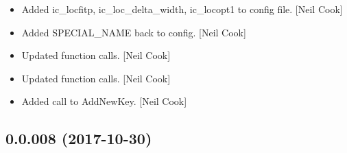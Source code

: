 \documentclass[a4paper,10pt,english]{report}
\begin{document}
\begin{itemize}
\item {} 
Added ic\_locfitp, ic\_loc\_delta\_width, ic\_locopt1 to config file. {[}Neil
Cook{]}

\item {} 
Added SPECIAL\_NAME back to config. {[}Neil Cook{]}

\item {} 
Updated function calls. {[}Neil Cook{]}

\item {} 
Updated function calls. {[}Neil Cook{]}

\item {} 
Added call to AddNewKey. {[}Neil Cook{]}

\end{itemize}


\subsection{0.0.008 (2017-10-30)}
\end{document}
